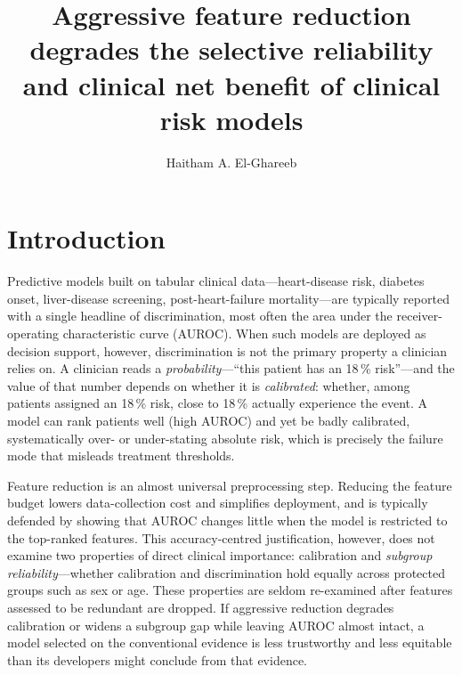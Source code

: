 \documentclass[fleqn,10pt]{wlscirep}
\title{Aggressive feature reduction degrades the selective reliability and clinical net benefit of
clinical risk models}
\author[1,*]{Haitham A. El-Ghareeb}
\affil[1]{Information Systems Department, Faculty of Computers and Information Sciences, Mansoura
University, Mansoura, Egypt}
\affil[*]{Corresponding author: helghareeb@mans.edu.eg}
\begin{document}
\flushbottom
\maketitle
\thispagestyle{empty}
\linenumbers

\section{Introduction}
\label{sec:intro}

Predictive models built on tabular clinical data---heart-disease risk, diabetes onset,
liver-disease screening, post-heart-failure mortality---are typically reported with a
single headline of discrimination, most often the area under the receiver-operating
characteristic curve (AUROC). When such models are deployed as decision support, however,
discrimination is not the primary property a clinician relies on. A clinician reads a
\emph{probability}---``this patient has an 18\,\% risk''---and the value of that
number depends on whether it is \emph{calibrated}: whether, among patients assigned an
18\,\% risk, close to 18\,\% actually experience the event. A model can
rank patients well (high AUROC) and yet be badly calibrated, systematically over- or
under-stating absolute risk, which is precisely the failure mode that misleads treatment
thresholds.

Feature reduction is an almost universal preprocessing step. Reducing the feature budget
lowers data-collection cost and simplifies deployment, and is typically defended by showing
that AUROC changes little when the model is restricted to the top-ranked features. This
accuracy-centred justification, however, does not examine two properties of direct clinical
importance: calibration and \emph{subgroup reliability}---whether calibration and discrimination
hold equally across protected groups such as sex or age. These properties are seldom re-examined
after features assessed to be redundant are dropped. If aggressive reduction degrades calibration or
widens a subgroup gap while leaving AUROC almost intact, a model selected on the conventional evidence
is less trustworthy and less equitable than its developers might conclude from that evidence.
\end{document}
